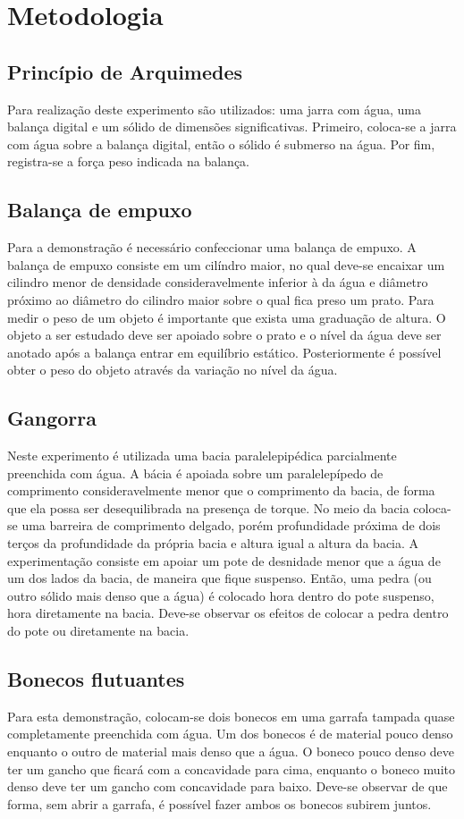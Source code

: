 \section{Metodologia}

\subsection{Princípio de Arquimedes}
Para realização deste experimento são utilizados: uma jarra com água, uma
balança digital e um sólido de dimensões significativas. Primeiro, coloca-se a
jarra com água sobre a balança digital, então o sólido é submerso na água. Por
fim, registra-se a força peso indicada na balança.

\subsection{Balança de empuxo}
Para a demonstração é necessário confeccionar uma balança de empuxo. A balança
de empuxo consiste em um cilíndro maior, no qual deve-se encaixar um cilindro
menor de densidade consideravelmente inferior à da água e diâmetro próximo ao
diâmetro do cilindro maior sobre o qual fica preso um prato. Para medir o peso
de um objeto é importante que exista uma graduação de altura. O objeto a ser
estudado deve ser apoiado sobre o prato e o nível da água deve ser anotado após
a balança entrar em equilíbrio estático. Posteriormente é possível obter o peso
do objeto através da variação no nível da água.

\subsection{Gangorra}
Neste experimento é utilizada uma bacia paralelepipédica parcialmente preenchida
com água. A bácia é apoiada sobre um paralelepípedo de comprimento
consideravelmente menor que o comprimento da bacia, de forma que ela possa ser
desequilibrada na presença de torque. No meio da bacia coloca-se uma barreira de
comprimento delgado, porém profundidade próxima de dois terços da profundidade
da própria bacia e altura igual a altura da bacia. A experimentação consiste em
apoiar um pote de desnidade menor que a água de um dos lados da bacia, de
maneira que fique suspenso. Então, uma pedra (ou outro sólido mais denso que a
água) é colocado hora dentro do pote suspenso, hora diretamente na bacia.
Deve-se observar os efeitos de colocar a pedra dentro do pote ou diretamente na
bacia. 

\subsection{Bonecos flutuantes}
Para esta demonstração, colocam-se dois bonecos em uma garrafa tampada quase
completamente preenchida com água. Um dos bonecos é de material pouco denso
enquanto o outro de material mais denso que a água. O boneco pouco denso deve
ter um gancho que ficará com a concavidade para cima, enquanto o boneco muito
denso deve ter um gancho com concavidade para baixo. Deve-se observar de que
forma, sem abrir a garrafa, é possível fazer ambos os bonecos subirem juntos. 


